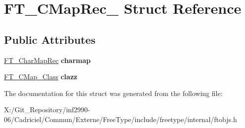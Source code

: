 \hypertarget{struct_f_t___c_map_rec__}{\section{F\-T\-\_\-\-C\-Map\-Rec\-\_\- Struct Reference}
\label{struct_f_t___c_map_rec__}
}
\subsection*{Public Attributes}
\begin{DoxyCompactItemize}
\item 
\hypertarget{struct_f_t___c_map_rec___a39fa6de9995d4ae4496b93e2b874b34e}{\hyperlink{struct_f_t___char_map_rec__}{F\-T\-\_\-\-Char\-Map\-Rec} {\bfseries charmap}}\label{struct_f_t___c_map_rec___a39fa6de9995d4ae4496b93e2b874b34e}

\item 
\hypertarget{struct_f_t___c_map_rec___aa85db42650df0edb38f8af5887c0ac6a}{\hyperlink{struct_f_t___c_map___class_rec__}{F\-T\-\_\-\-C\-Map\-\_\-\-Class} {\bfseries clazz}}\label{struct_f_t___c_map_rec___aa85db42650df0edb38f8af5887c0ac6a}

\end{DoxyCompactItemize}


The documentation for this struct was generated from the following file\-:\begin{DoxyCompactItemize}
\item 
X\-:/\-Git\-\_\-\-Repository/inf2990-\/06/\-Cadriciel/\-Commun/\-Externe/\-Free\-Type/include/freetype/internal/ftobjs.\-h\end{DoxyCompactItemize}
